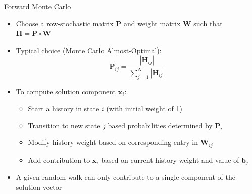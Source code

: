 \documentclass{beamer}
\begin{document}
\begin{frame}{Forward Monte Carlo}
\begin{itemize}
  \item Choose a row-stochastic matrix $\mathbf{P}$ and weight matrix
    $\mathbf{W}$ such that $\mathbf{H} = \mathbf{P} \circ \mathbf{W}$
  \item Typical choice (Monte Carlo Almost-Optimal):
    \begin{equation*}
      \mathbf{P}_{ij} = \frac{| \mathbf{H}_{ij}| }
      {\sum_{j=1}^{N} | \mathbf{H}_{ij} | }
    \end{equation*}
  \item To compute solution component $\mathbf{x}_i$:
    \begin{itemize}
      \item Start a history in state $i$ (with initial weight of 1)
      \item Transition to new state $j$ based probabilities determined by
        $\mathbf{P}_i$
      \item Modify history weight based on corresponding entry in
        $\mathbf{W}_{ij}$
      \item Add contribution to $\mathbf{x}_i$ based on current history weight
        and value of $\mathbf{b}_j$
    \end{itemize}
  \item A given random walk can only contribute to a single component of
    the solution vector
\end{itemize}
\end{frame}

\end{document}
